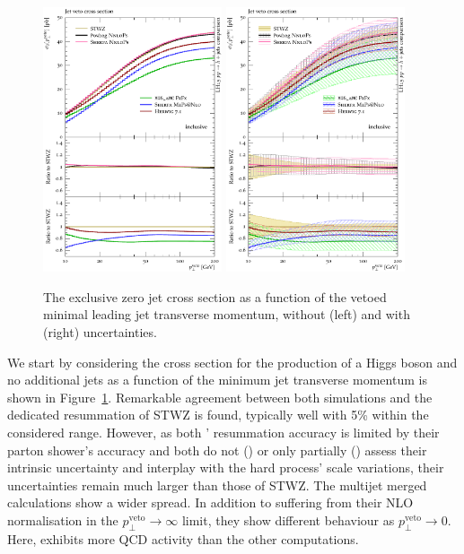\begin{figure}[t!]
  \centering
  \includegraphics[width=0.47\textwidth]{figures/hjetscomp_u_xs_jet_veto_j0.pdf}
  \hfill
  \includegraphics[width=0.47\textwidth]{figures/hjetscomp_xs_jet_veto_j0.pdf}
  \caption{
    The exclusive zero jet cross section as a function of 
    the vetoed minimal leading jet transverse momentum,
    without (left) and with (right) uncertainties.
    \label{fig:hjetscomp:results:jvobs:jvxs0}
  }
\end{figure}

We start by considering 
the cross section for the production of a Higgs boson and no 
additional jets as a function of the minimum jet transverse momentum 
is shown in Figure~\ref{fig:hjetscomp:results:jvobs:jvxs0}. Remarkable 
agreement between both \NNLOPS simulations and the dedicated resummation 
of STWZ is found, typically well with 5\% within the considered range. 
However, as both \NNLOPS' resummation accuracy is limited by their parton 
shower's accuracy and both do not (\Powheg) or only partially (\Sherpa) 
assess their intrinsic uncertainty and interplay with the hard process' 
scale variations, their uncertainties remain much larger than those of 
STWZ. The multijet merged calculations show a wider spread. In addition to 
suffering from their NLO normalisation in the $p_\perp^\text{veto}\to\infty$ 
limit, they show different behaviour as $p_\perp^\text{veto}\to 0$. Here, 
\Sherpa \MEPSatNLO exhibits more QCD activity than the other computations. 

